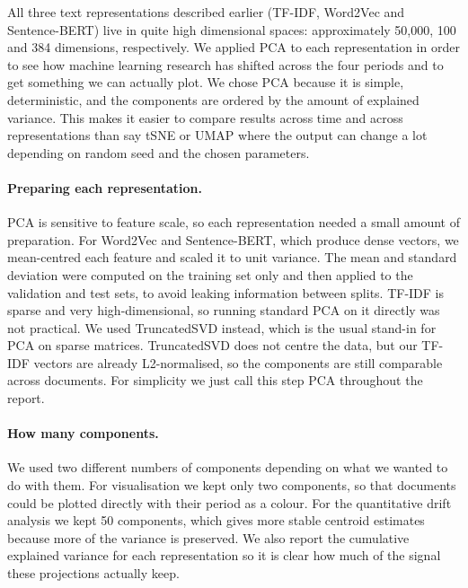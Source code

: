 \documentclass[11pt]{article}
\begin{document}
All three text representations described earlier (TF-IDF, Word2Vec and Sentence-BERT) live in quite high dimensional spaces: approximately 50,000, 100 and 384 dimensions, respectively. We applied PCA to each representation in order to see how machine learning research has shifted across the four periods and to get something we can actually plot. We chose PCA because it is simple, deterministic, and the components are ordered by the amount of explained variance. This makes it easier to compare results across time and across representations than say tSNE or UMAP where the output can change a lot depending on random seed and the chosen parameters.

\paragraph{Preparing each representation.}
PCA is sensitive to feature scale, so each representation needed a small amount of preparation. For Word2Vec and Sentence-BERT, which produce dense vectors, we mean-centred each feature and scaled it to unit variance. The mean and standard deviation were computed on the training set only and then applied to the validation and test sets, to avoid leaking information between splits. TF-IDF is sparse and very high-dimensional, so running standard PCA on it directly was not practical. We used TruncatedSVD instead, which is the usual stand-in for PCA on sparse matrices. TruncatedSVD does not centre the data, but our TF-IDF vectors are already L2-normalised, so the components are still comparable across documents. For simplicity we just call this step PCA throughout the report.

\paragraph{How many components.}
We used two different numbers of components depending on what we wanted to do with them. For visualisation we kept only two components, so that documents could be plotted directly with their period as a colour. For the quantitative drift analysis we kept 50 components, which gives more stable centroid estimates because more of the variance is preserved. We also report the cumulative explained variance for each representation so it is clear how much of the signal these projections actually keep.
\end{document}
